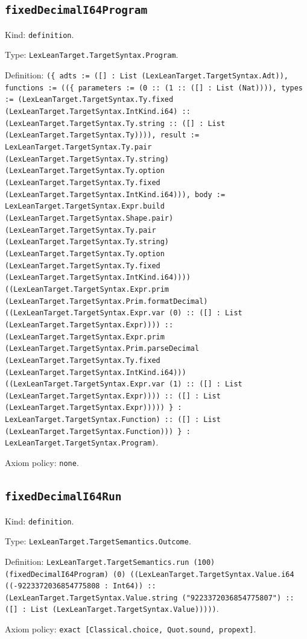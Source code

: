 \documentclass[11pt]{article}
\begin{document}
\subsection*{\texttt{fixedDecimalI64Program}}
\noindent Kind: \texttt{definition}.\par
\noindent Type: \texttt{LexLeanTarget.TargetSyntax.Program}.\par
\noindent Definition: \texttt{(\{ adts := ([] : List (LexLeanTarget.TargetSyntax.Adt)), functions := ((\{ parameters := (0 :: (1 :: ([] : List (Nat)))), types := (LexLeanTarget.TargetSyntax.Ty.fixed (LexLeanTarget.TargetSyntax.IntKind.i64) :: (LexLeanTarget.TargetSyntax.Ty.string :: ([] : List (LexLeanTarget.TargetSyntax.Ty)))), result := LexLeanTarget.TargetSyntax.Ty.pair (LexLeanTarget.TargetSyntax.Ty.string) (LexLeanTarget.TargetSyntax.Ty.option (LexLeanTarget.TargetSyntax.Ty.fixed (LexLeanTarget.TargetSyntax.IntKind.i64))), body := LexLeanTarget.TargetSyntax.Expr.build (LexLeanTarget.TargetSyntax.Shape.pair) (LexLeanTarget.TargetSyntax.Ty.pair (LexLeanTarget.TargetSyntax.Ty.string) (LexLeanTarget.TargetSyntax.Ty.option (LexLeanTarget.TargetSyntax.Ty.fixed (LexLeanTarget.TargetSyntax.IntKind.i64)))) ((LexLeanTarget.TargetSyntax.Expr.prim (LexLeanTarget.TargetSyntax.Prim.formatDecimal) ((LexLeanTarget.TargetSyntax.Expr.var (0) :: ([] : List (LexLeanTarget.TargetSyntax.Expr)))) :: (LexLeanTarget.TargetSyntax.Expr.prim (LexLeanTarget.TargetSyntax.Prim.parseDecimal (LexLeanTarget.TargetSyntax.Ty.fixed (LexLeanTarget.TargetSyntax.IntKind.i64))) ((LexLeanTarget.TargetSyntax.Expr.var (1) :: ([] : List (LexLeanTarget.TargetSyntax.Expr)))) :: ([] : List (LexLeanTarget.TargetSyntax.Expr))))) \} : LexLeanTarget.TargetSyntax.Function) :: ([] : List (LexLeanTarget.TargetSyntax.Function))) \} : LexLeanTarget.TargetSyntax.Program)}.\par
\noindent Axiom policy: \texttt{none}.\par
\subsection*{\texttt{fixedDecimalI64Run}}
\noindent Kind: \texttt{definition}.\par
\noindent Type: \texttt{LexLeanTarget.TargetSemantics.Outcome}.\par
\noindent Definition: \texttt{LexLeanTarget.TargetSemantics.run (100) (fixedDecimalI64Program) (0) ((LexLeanTarget.TargetSyntax.Value.i64 ((-9223372036854775808 : Int64)) :: (LexLeanTarget.TargetSyntax.Value.string ("9223372036854775807") :: ([] : List (LexLeanTarget.TargetSyntax.Value)))))}.\par
\noindent Axiom policy: \texttt{exact [Classical.choice, Quot.sound, propext]}.\par
\end{document}
